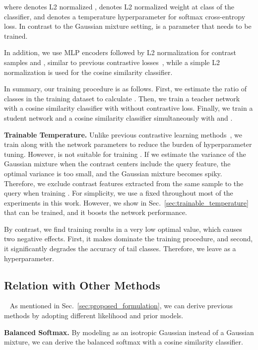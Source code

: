 \documentclass{article}
\theoremstyle{plain}
\theoremstyle{definition}
\theoremstyle{remark}
\begin{document}
where  denotes L2 normalized ,  denotes L2 normalized weight at class  of the classifier, and  denotes a temperature hyperparameter for softmax cross-entropy loss. In contrast to the Gaussian mixture setting,  is a parameter that needs to be trained.

In addition, we use MLP encoders followed by L2 normalization for contrast samples  and , similar to previous contrastive losses~\cite{chen2020simple,chen2020improved}, while a simple L2 normalization is used for the cosine similarity classifier.


In summary, our training procedure is as follows. First, we estimate the ratio of classes in the training dataset to calculate . Then, we train a teacher network with a cosine similarity classifier with  without contrastive loss. Finally, we train a student network and a cosine similarity classifier simultaneously with  and .

\textbf{Trainable Temperature.}
Unlike previous contrastive learning methods~\cite{chen2020simple,he2020momentum,khosla2020supervised,tian2020contrastive,cui2021parametric,zhu2022balanced}, we train  along with the network parameters to reduce the burden of hyperparameter tuning. However,  is not suitable for training . If we estimate the variance of the Gaussian mixture when the contrast centers include the query feature, the optimal variance is too small, and the Gaussian mixture becomes spiky. Therefore, we exclude contrast features extracted from the same sample to the query when training . For simplicity, we use a fixed  throughout most of the experiments in this work. However, we show in Sec.~\ref{sec:trainable_temperature} that  can be trained, and it boosts the network performance.

By contrast, we find training  results in a very low optimal value, which causes two negative effects. First, it makes  dominate the training procedure, and second, it significantly degrades the accuracy of tail classes. Therefore, we leave  as a hyperparameter.

\subsection{Relation with Other Methods}~\label{sec:extending_gml}
As mentioned in Sec.~\ref{sec:proposed_formulation}, we can derive previous methods by adopting different likelihood and prior models.

\textbf{Balanced Softmax.} By modeling  as an isotropic Gaussian instead of a Gaussian mixture, we can derive the balanced softmax with a cosine similarity classifier.
\end{document}
